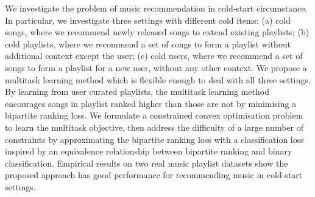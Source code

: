 We investigate the problem of music recommendation in cold-start circumstance.
In particular, we investigate three settings with different cold items:
(a) cold songs, where we recommend newly released songs to extend existing playlists;
(b) cold playlists, where we recommend a set of songs to form a playlist without additional context except the user;
(c) cold users, where we recommend a set of songs to form a playlist for a new user, without any other context.
We propose a multitask learning method which is flexible enough to deal with all three settings.
By learning from user curated playlists, the multitask learning method encourages songs in playlist 
ranked higher than those are not by minimising a bipartite ranking loss.
We formulate a constrained convex optimisation problem to learn the multitask objective,
then address the difficulty of a large number of constraints by approximating the bipartite ranking loss
with a classification loss inspired by an equivalence relationship between bipartite ranking and binary classification.
Empirical results on two real music playlist datasets show the proposed approach has good performance for recommending music 
in cold-start settings.
